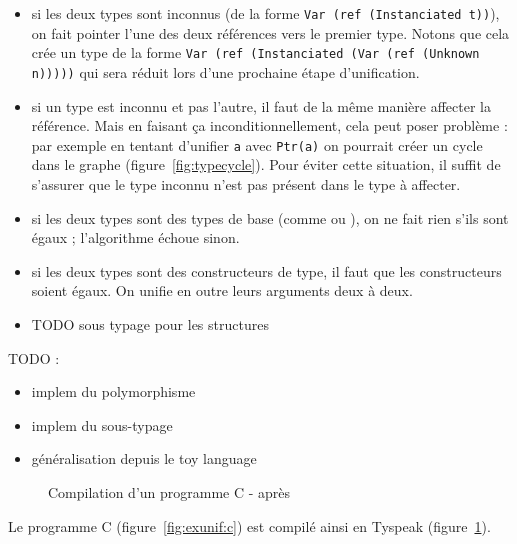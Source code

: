 \begin{itemize}

\item si les deux types sont inconnus (de la forme \texttt{Var (ref
(Instanciated t))}), on fait pointer l'une des deux références vers le premier
type. Notons que cela crée un type de la forme \texttt{Var (ref (Instanciated
(Var (ref (Unknown n)))))} qui sera réduit lors d'une prochaine étape
d'unification.

\item si un type est inconnu et pas l'autre, il faut de la même manière affecter la
référence. Mais en faisant ça inconditionnellement, cela peut poser problème :
par exemple en tentant d'unifier \texttt{a} avec \texttt{Ptr(a)} on pourrait
créer un cycle dans le graphe (figure~\ref{fig:typecycle}).
Pour éviter cette situation, il suffit de s'assurer que le type inconnu n'est
pas présent dans le type à affecter.

\item si les deux types sont des types de base (comme \tInt ou \tFloat), on ne
fait rien s'ils sont égaux ; l'algorithme échoue sinon.

\item si les deux types sont des constructeurs de type, il faut que les
constructeurs soient égaux. On unifie en outre leurs arguments deux à deux.

\item TODO sous typage pour les structures

\end{itemize}


TODO :

\begin{itemize}
\item implem du polymorphisme
\item implem du sous-typage
\item généralisation depuis le toy language
\end{itemize}

\clearpage

\begin{figure} %


  \caption{Compilation d'un programme C - après}
  \label{fig:exunif:tpk}
\end{figure} %

Le programme C (figure~\ref{fig:exunif:c}) est compilé ainsi en Tyspeak
(figure~\ref{fig:exunif:tpk}).

